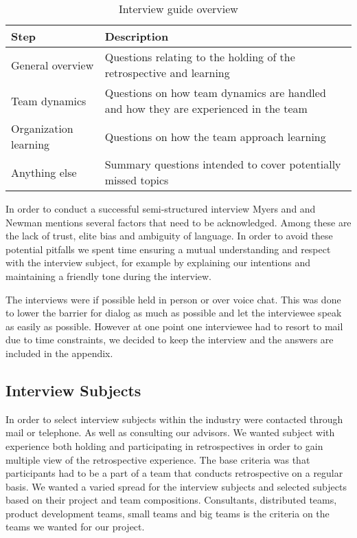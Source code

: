 \begin{table}
	\begin{centering}
	\caption{Interview guide overview}
	\label{table:interview-guide-overview}
	\begin{tabular}{l p{}}
	 	Step & Description \\ 
		\hline
		General overview & Questions relating to the holding of the retrospective and learning\\
		Team dynamics & Questions on how team dynamics are handled and how they are experienced in the team \\
		Organization learning & Questions on how the team approach learning \\
		Anything else & Summary questions intended to cover potentially missed topics \\
	\end{tabular}
	\end{centering}
\end{table}

In order to conduct a successful semi-structured interview Myers and and Newman mentions several factors that need to be acknowledged. \cite{Myers2007} Among these are the lack of trust, elite bias and ambiguity of language. In order to avoid these potential pitfalls we spent time ensuring a mutual understanding and respect with the interview subject, for example by explaining our intentions and maintaining a friendly tone during the interview. 

The interviews were if possible held in person or over voice chat. This was done to lower the barrier for dialog as much as possible and let the interviewee speak as easily as possible. However at one point one interviewee had to resort to mail due to time constraints, we decided to keep the interview and the answers are included in the appendix. 

\subsection{Interview Subjects}
\label{subsec:Interview-Subjects}
In order to select interview subjects within the industry were contacted through mail or telephone. As well as consulting our advisors. We wanted subject with experience both holding and participating in retrospectives in order to gain multiple view of the retrospective experience. The base criteria was that participants had to be a part of a team that conducts retrospective on a regular basis. We wanted a varied spread for the interview subjects and selected subjects based on their project and team compositions. Consultants, distributed teams, product development teams, small teams and big teams is the criteria on the teams we wanted for our project.

